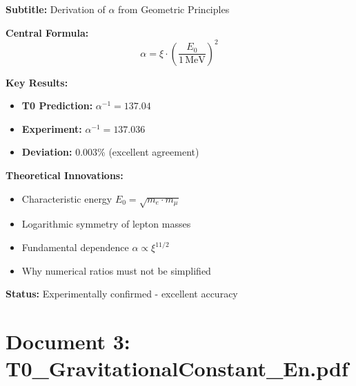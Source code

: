 \documentclass[12pt,a4paper]{article}
\newcommand{\xipar}{\xi}
\begin{document}
	\begin{documentbox}
		\textbf{Subtitle:} Derivation of $\alpha$ from Geometric Principles
		
		\textbf{Central Formula:}
		\begin{equation}
			\boxed{\alpha = \xipar \cdot \left(\frac{E_0}{1\,\text{MeV}}\right)^2}
		\end{equation}
		
		\textbf{Key Results:}
		\begin{itemize}
			\item \textbf{T0 Prediction:} $\alpha^{-1} = 137.04$
			\item \textbf{Experiment:} $\alpha^{-1} = 137.036$
			\item \textbf{Deviation:} 0.003\% (excellent agreement)
		\end{itemize}
		
		\textbf{Theoretical Innovations:}
		\begin{itemize}
			\item Characteristic energy $E_0 = \sqrt{m_e \cdot m_\mu}$
			\item Logarithmic symmetry of lepton masses
			\item Fundamental dependence $\alpha \propto \xipar^{11/2}$
			\item Why numerical ratios must not be simplified
		\end{itemize}
		
		\textbf{Status:} Experimentally confirmed - excellent accuracy
	\end{documentbox}
	
	\section{Document 3: T0\_GravitationalConstant\_En.pdf}
	
\end{document}
